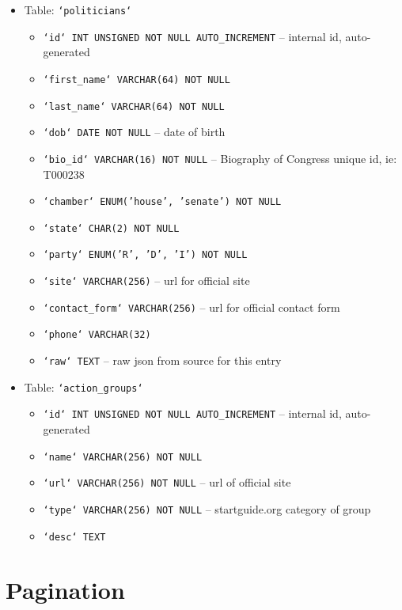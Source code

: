 \documentclass[12pt]{article}
\newcommand{\code}[1]{\texttt{#1}}
\begin{document}
\begin{itemize}
\begin{itemize}
	\end{itemize}
	\item[] Table: \code{`politicians`}
	\begin{itemize}
		\item \code{`id` INT UNSIGNED NOT NULL AUTO\_INCREMENT}	-- internal id, auto-generated
		\item \code{`first\_name` VARCHAR(64) NOT NULL}
		\item \code{`last\_name` VARCHAR(64) NOT NULL}
		\item \code{`dob` DATE NOT NULL}						-- date of birth
		\item \code{`bio\_id` VARCHAR(16) NOT NULL}				-- Biography of Congress unique id, ie: T000238
		\item \code{`chamber` ENUM('house', 'senate') NOT NULL}
		\item \code{`state` CHAR(2) NOT NULL}
		\item \code{`party` ENUM('R', 'D', 'I') NOT NULL}
		\item \code{`site` VARCHAR(256)}						-- url for official site
		\item \code{`contact\_form` VARCHAR(256)}				-- url for official contact form
		\item \code{`phone` VARCHAR(32)}
		\item \code{`raw` TEXT}									-- raw json from source for this entry
	\end{itemize}
	\item[] Table: \code{`action\_groups`}
	\begin{itemize}
		\item \code{`id` INT UNSIGNED NOT NULL AUTO\_INCREMENT}	-- internal id, auto-generated
		\item \code{`name` VARCHAR(256) NOT NULL}
		\item \code{`url` VARCHAR(256) NOT NULL}				-- url of official site
		\item \code{`type` VARCHAR(256) NOT NULL}				-- startguide.org category of group
		\item \code{`desc` TEXT}
	\end{itemize}
\end{itemize}


\section{Pagination}
\end{document}
